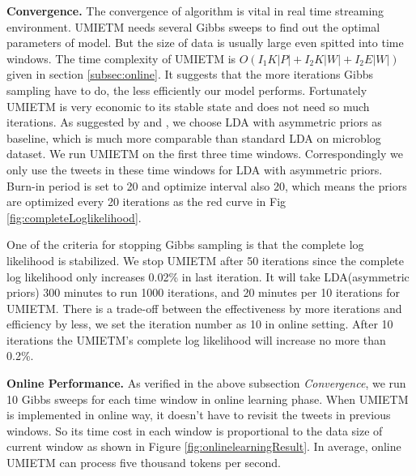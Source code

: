\documentclass{llncs}
\begin{document}
\textbf{Convergence.}
The convergence of algorithm is vital in real time streaming environment. 
UMIETM needs several Gibbs sweeps to find out the optimal parameters of model.
But the size of data is usually large even spitted into time windows.
The time complexity of UMIETM is \(O(I_1K|P|+I_2K|W|+I_2E|W|)\) given in section \ref{subsec:online}.
It suggests that the more iterations Gibbs sampling have to do, the less efficiently our model performs. 
Fortunately UMIETM is very economic to its stable state and does not need so much iterations.
As suggested by \cite{wallach2009rethinking} and \cite{jian2014factorOfTopicModel}, we choose LDA with asymmetric priors as baseline, which is much more comparable than standard LDA on microblog dataset.
We run UMIETM on the first three time windows. 
Correspondingly we only use the tweets in these time windows for LDA with asymmetric priors.
Burn-in period is set to 20 and optimize interval also 20, which means the priors are optimized every 20 iterations as the red curve in Fig \ref{fig:completeLoglikelihood}.

One of the criteria for stopping Gibbs sampling is that the complete log likelihood is stabilized.
We stop UMIETM after 50 iterations since the complete log likelihood only increases 0.02\% in last iteration.
It will take LDA(asymmetric priors) 300 minutes to run 1000 iterations, and 20 minutes per 10 iterations for UMIETM.
There is a trade-off between the effectiveness by more iterations and efficiency by less,  we set the iteration number as 10 in online setting.
After 10 iterations the UMIETM's complete log likelihood will increase no more than 0.2\%.

\textbf{Online Performance.}
As verified in the above subsection \textit{Convergence}, we run 10 Gibbs sweeps for each time window in online learning phase.
When UMIETM is implemented in online way, it doesn't have to revisit the tweets in previous windows. 
So its time cost in each window is proportional to the data size of current window  as shown in Figure \ref{fig:onlinelearningResult}.
In average, online UMIETM can process five thousand tokens per second.
\end{document}

